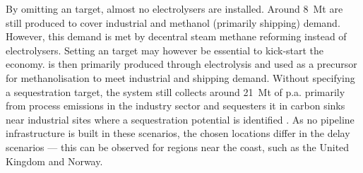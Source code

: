 \documentclass[10pt]{article}
\let\autocite\cite
\begin{document}
By omitting an  target, almost no electrolysers are installed. Around \SI{8}{Mt} are still produced to cover industrial  and methanol (primarily shipping) demand. However, this demand is met by decentral steam methane reforming instead of electrolysers. Setting an  target may however be essential to kick-start the  economy.  is then primarily produced through electrolysis and used as a precursor for methanolisation to meet industrial and shipping demand.
Without specifying a  sequestration target, the system still collects around \SI{21}{Mt} of  p.a. primarily from process emissions in the industry sector and sequesters it in carbon sinks near industrial sites where a sequestration potential is identified \autocite{hofmannH2CO2Network2024}. As no pipeline infrastructure is built in these scenarios, the chosen locations differ in the delay scenarios --- this can be observed for regions near the coast, such as the United Kingdom and Norway.
\end{document}
